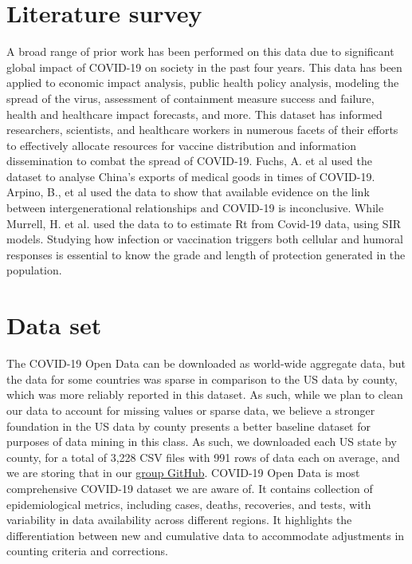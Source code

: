 \documentclass[sigconf,screen,nonacm]{acmart}
\begin{document}
\section{Literature survey}
A broad range of prior work has been performed on this data due to significant global impact of COVID-19 on society in the past four years. This data has been applied to economic impact analysis, public health policy analysis, modeling the spread of the virus, assessment of containment measure success and failure, health and healthcare impact forecasts, and more. This dataset has informed researchers, scientists, and healthcare workers in numerous facets of their efforts to effectively allocate resources for vaccine distribution and information dissemination to combat the spread of COVID-19. Fuchs, A. et al \cite{fuchs2020mask} used the dataset to analyse China’s exports of medical goods in times of COVID-19. Arpino, B., et al \cite{arpino2020no} used the data to show that available evidence on the link between intergenerational relationships and COVID-19 is inconclusive. While Murrell, H. et al. \cite{murrell2020estimating} used the data to to estimate Rt from Covid-19 data, using SIR models. Studying how infection or vaccination triggers both cellular and humoral responses is essential to know the grade and length of protection generated in the population.

\section{Data set}
The COVID-19 Open Data can be downloaded as world-wide aggregate data, but the data for some countries was sparse in comparison to the US data by county, which was more reliably reported in this dataset. As such, while we plan to clean our data to account for missing values or sparse data, we believe a stronger foundation in the US data by county presents a better baseline dataset for purposes of data mining in this class. As such, we downloaded each US state by county, for a total of 3,228 CSV files with 991 rows of data each on average, and we are storing that in our \href{https://github.com/CCoakley6/DataMiningProjectSpring2024}{group GitHub}. COVID-19 Open Data is most comprehensive COVID-19 dataset we are aware of. It contains collection of epidemiological metrics, including cases, deaths, recoveries, and tests, with variability in data availability across different regions. It highlights the differentiation between new and cumulative data to accommodate adjustments in counting criteria and corrections.
\end{document}
